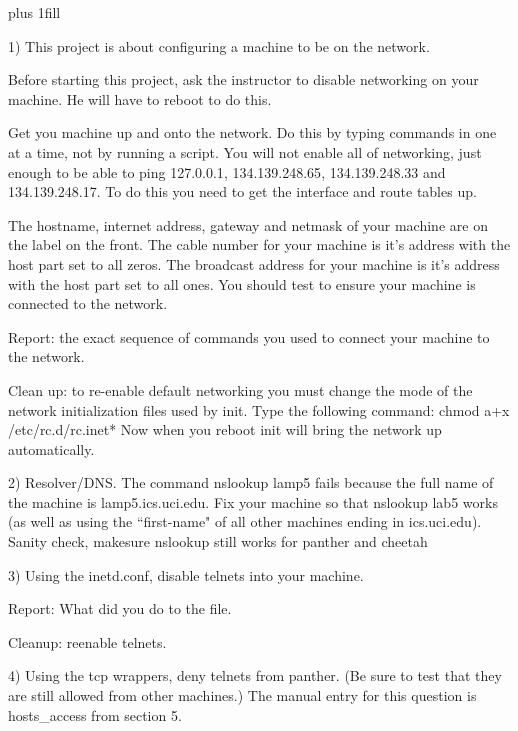 
\rightskip=0pt plus 1fill

\parindent 0pt

1) This project is about configuring a machine to be on the network.

Before starting this project, ask the instructor to disable networking
on your machine. He will have to reboot to do this.

Get you machine up and onto the network.
Do this by typing commands in one at a time, not by running a script.
You will not enable all of networking, just enough to be
able to ping {\ltt{}127.0.0.1}, {\ltt{}134.139.248.65},
{\ltt{}134.139.248.33} and {\ltt{}134.139.248.17}.
To do this you need to get the interface and route tables up.

The hostname, internet address, gateway and netmask of your machine are
on the label on the front.
The cable number for your machine is it's address with the host
part set to all zeros.
The broadcast address for your machine is it's address with the host
part set to all ones.
You should test to ensure your machine is connected to the network.

Report: the exact sequence of commands you used to connect your machine
to the network.

Clean up: to re-enable default networking you must change the mode
of the network initialization files used by {\ltt{}init}.
Type the following command:
\hfill\break
{\ltt{}chmod a+x /etc/rc.d/rc.inet*}
\hfill\break
Now when you reboot {\ltt{}init} will bring the network up automatically.

2) Resolver/DNS. The command {\ltt{}nslookup lamp5} fails because the full
name of the machine is {\ltt{}lamp5.ics.uci.edu}.
Fix your machine so that {\ltt{}nslookup lab5} works (as well as using
the ``first-name" of all other machines ending in {\ltt{}ics.uci.edu}).
Sanity check, makesure {\ltt{}nslookup} still works for {\ltt{}panther}
and {\ltt{}cheetah}

3) Using the {\ltt{}inetd.conf}, disable telnets into your machine.

Report: What did you do to the file.

Cleanup: reenable telnets.

4) Using the tcp wrappers, deny telnets from {\ltt{}panther}. (Be sure to test
that they are still allowed from other machines.)
The manual entry for this question is {\ltt{}hosts_access} from section 5.

